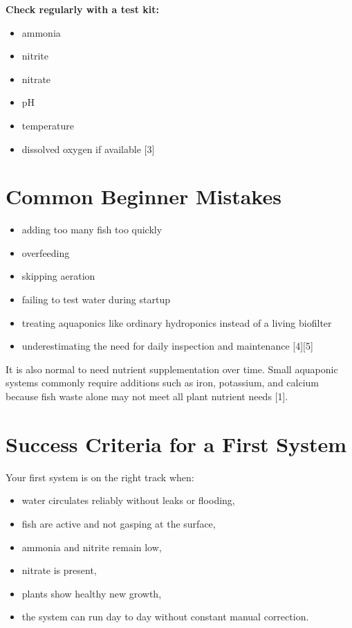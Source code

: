 \documentclass[11pt]{article}
\begin{document}
\textbf{Check regularly with a test kit:}
\begin{itemize}
  \item ammonia
  \item nitrite
  \item nitrate
  \item pH
  \item temperature
  \item dissolved oxygen if available [3]
\end{itemize}

\section*{Common Beginner Mistakes}
\begin{itemize}
  \item adding too many fish too quickly
  \item overfeeding
  \item skipping aeration
  \item failing to test water during startup
  \item treating aquaponics like ordinary hydroponics instead of a living biofilter
  \item underestimating the need for daily inspection and maintenance [4][5]
\end{itemize}

It is also normal to need nutrient supplementation over time. Small aquaponic systems commonly require additions such as iron, potassium, and calcium because fish waste alone may not meet all plant nutrient needs [1].

\section*{Success Criteria for a First System}
Your first system is on the right track when:
\begin{itemize}
  \item water circulates reliably without leaks or flooding,
  \item fish are active and not gasping at the surface,
  \item ammonia and nitrite remain low,
  \item nitrate is present,
  \item plants show healthy new growth,
  \item the system can run day to day without constant manual correction.
\end{itemize}
\end{document}
